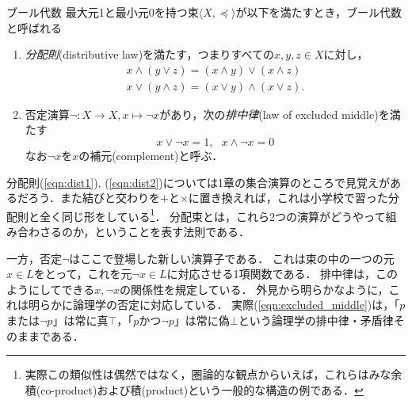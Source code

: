 \documentclass[11pt,a4paper]{jsarticle}
\begin{document}
\begin{itembox}[l]{ブール代数}
    最大元1と最小元0を持つ束$\langle X, \preceq \rangle$が以下を満たすとき，ブール代数と呼ばれる
    \begin{enumerate}
        \item \emph{分配則}(distributive law)を満たす，つまりすべての$x, y, z \in X$に対し，
        \begin{align}
         x \wedge (y \vee z) = (x \wedge y) \vee (x \wedge z) \label{eqn:dist1}\\
         x \vee (y \wedge z) = (x \vee y) \wedge (x \vee z) . \label{eqn:dist2}
        \end{align}
        \item 否定演算$\neg: X \to X, x \mapsto \neg x$があり，次の\emph{排中律}(law of excluded middle)を満たす
        \begin{equation}
            x \vee \neg x = 1, \ \ \ x \wedge \neg x = 0
           \label{eqn:excluded_middle}
        \end{equation}
        なお$\neg x$を$x$の補元(complement)と呼ぶ．
    \end{enumerate}   
\end{itembox}

分配則(\ref{eqn:dist1}), (\ref{eqn:dist2})については1章の集合演算のところで見覚えがあるだろう．また結びと交わりを$+$と$\times$に置き換えれば，これは小学校で習った分配則と全く同じ形をしている\footnote{実際この類似性は偶然ではなく，圏論的な観点からいえば，これらはみな余積(co-product)および積(product)という一般的な構造の例である．}．
分配束とは，これら2つの演算がどうやって組み合わさるのか，ということを表す法則である．

一方，否定$\neg$はここで登場した新しい演算子である．
これは束の中の一つの元$x \in L$をとって，これを元$\neg x \in L$に対応させる1項関数である．
排中律は，このようにしてできる$x, \neg x$の関係性を規定している．
外見から明らかなように，これは明らかに論理学の否定に対応している．
実際(\ref{eqn:excluded_middle})は，「$p$または$\neg p$」は常に真$\top$，「$p$かつ$\neg p$」は常に偽$\bot$という論理学の排中律・矛盾律そのままである．

 
\end{document}
